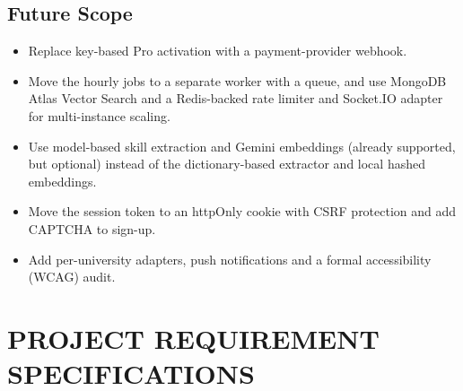 \documentclass[12pt,a4paper]{report}
\begin{document}
\section{Future Scope}
\begin{itemize}[leftmargin=*]
    \item Replace key-based Pro activation with a payment-provider webhook.
    \item Move the hourly jobs to a separate worker with a queue, and use MongoDB Atlas Vector Search and a Redis-backed rate limiter and Socket.IO adapter for multi-instance scaling.
    \item Use model-based skill extraction and Gemini embeddings (already supported, but optional) instead of the dictionary-based extractor and local hashed embeddings.
    \item Move the session token to an httpOnly cookie with CSRF protection and add CAPTCHA to sign-up.
    \item Add per-university adapters, push notifications and a formal accessibility (WCAG) audit.
\end{itemize}

\chapter{PROJECT REQUIREMENT SPECIFICATIONS}
\end{document}

